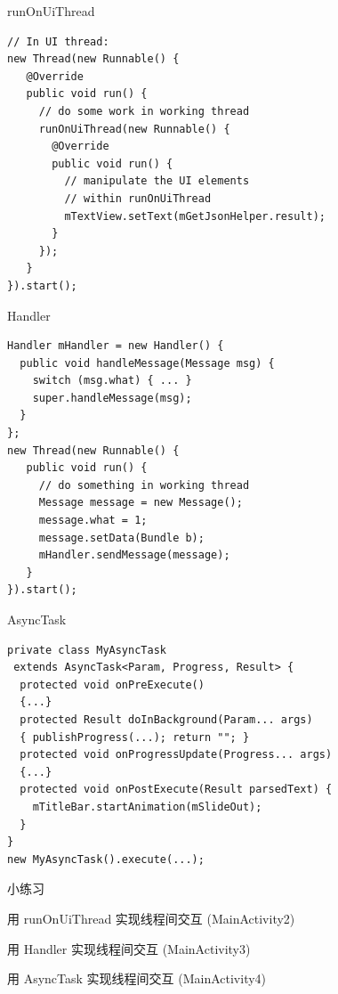 \documentclass[presentation,dvipdfmx,CJKbookmarks]{beamer}
\begin{document}
\begin{CJK*}{UTF8}{simsun}
\begin{enumerate}
\begin{frame}[fragile,label={sec:orgb30629a}]{runOnUiThread}
 \begin{verbatim}
// In UI thread:
new Thread(new Runnable() {
   @Override
   public void run() {
     // do some work in working thread
     runOnUiThread(new Runnable() {
       @Override
       public void run() {
         // manipulate the UI elements
         // within runOnUiThread
         mTextView.setText(mGetJsonHelper.result);
       }
     });
   }
}).start();
\end{verbatim}
\end{frame}

\begin{frame}[fragile,label={sec:orgfeef6a4}]{Handler}
 \begin{verbatim}
Handler mHandler = new Handler() {
  public void handleMessage(Message msg) {
    switch (msg.what) { ... }
    super.handleMessage(msg);
  }
};
new Thread(new Runnable() {
   public void run() {
     // do something in working thread
     Message message = new Message();
     message.what = 1;
     message.setData(Bundle b);
     mHandler.sendMessage(message);
   }
}).start();
\end{verbatim}
\end{frame}

\begin{frame}[fragile,label={sec:org96ee0b3}]{AsyncTask}
 \begin{verbatim}
private class MyAsyncTask
 extends AsyncTask<Param, Progress, Result> {
  protected void onPreExecute()
  {...}
  protected Result doInBackground(Param... args)
  { publishProgress(...); return ""; }
  protected void onProgressUpdate(Progress... args)
  {...}
  protected void onPostExecute(Result parsedText) {
    mTitleBar.startAnimation(mSlideOut);
  }
}
new MyAsyncTask().execute(...);
\end{verbatim}
\end{frame}
\begin{frame}[label={sec:org6f9e31d}]{小练习}
\begin{block}{用 runOnUiThread 实现线程间交互 (MainActivity2)}
\end{block}
\begin{block}{用 Handler 实现线程间交互 (MainActivity3)}
\end{block}
\begin{block}{用 AsyncTask 实现线程间交互 (MainActivity4)}
\end{block}
\end{frame}


\end{enumerate}
\end{CJK*}
\end{document}
